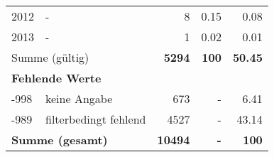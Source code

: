 \begin{longtable}{lXrrr}
     2012 &
     \multicolumn{1}{X}{ -  } &


       \num{8} &
       \num[round-mode=places,round-precision=2]{0,15} &
         \num[round-mode=places,round-precision=2]{0,08} \\

     2013 &
     \multicolumn{1}{X}{ -  } &


       \num{1} &
       \num[round-mode=places,round-precision=2]{0,02} &
         \num[round-mode=places,round-precision=2]{0,01} \\
     \midrule
     \multicolumn{2}{l}{Summe (gültig)} &
       \textbf{\num{5294}} &
     \textbf{100} &
       \textbf{\num[round-mode=places,round-precision=2]{50,45}} \\
     \multicolumn{5}{l}{\textbf{Fehlende Werte}}\\
       -998 &
       keine Angabe &
         \num{673} &
        - &
         \num[round-mode=places,round-precision=2]{6,41} \\
       -989 &
       filterbedingt fehlend &
         \num{4527} &
        - &
         \num[round-mode=places,round-precision=2]{43,14} \\
     \midrule
     \multicolumn{2}{l}{\textbf{Summe (gesamt)}} &
          \textbf{\num{10494}} &
        \textbf{-} &
        \textbf{100} \\
     \bottomrule
     \end{longtable}
     
